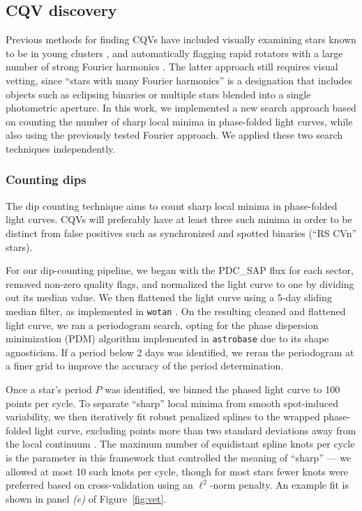 \documentclass[11pt,twocolumn,tighten]{aastex63}
\begin{document}
\subsection{CQV discovery}
\label{subsec:discoverymethods}

Previous methods for finding CQVs have included visually examining
stars known to be in young clusters
\citep{2016AJ....152..114R,2017AJ....153..152S}, and automatically
flagging rapid rotators with a large number of strong Fourier
harmonics \citep{2019ApJ...876..127Z}.  The latter approach still
requires visual vetting, since ``stars with many Fourier harmonics''
is a designation that includes objects such as eclipsing binaries or
multiple stars blended into a single photometric aperture.  In this
work, we implemented a new search approach based on counting the
number of sharp local minima in phase-folded light curves, while also
using the previously tested Fourier approach.  We applied these two
search techniques independently.   


\subsubsection{Counting dips}
\label{subsec:counting}

The dip counting technique aims to count sharp local minima in
phase-folded light curves.  CQVs will preferably have at least three
such minima in order to be distinct from false positives such as
synchronized and spotted binaries (``RS CVn'' stars). 

For our dip-counting pipeline, we began with the PDC\_SAP flux for
each sector, removed non-zero quality flags, and normalized the light
curve to one by dividing out its median value.  We then flattened the
light curve using a 5-day sliding median filter, as implemented in
\texttt{wotan} \citep{2019AJ....158..143H}.  On the resulting cleaned
and flattened light curve, we ran a periodogram search, opting for the
\citet{1978ApJ...224..953S} phase dispersion minimization (PDM)
algorithm implemented in \texttt{astrobase}
\citep{2021zndo...1011188B} due to its shape agnosticism.  If a period
below 2 days was identified, we reran the periodogram at a finer grid
to improve the accuracy of the period determination.

Once a star's period $P$ was identified, we binned the phased light
curve to 100 points per cycle.  To separate ``sharp'' local minima
from smooth spot-induced variability, we then iteratively fit robust
penalized splines to the wrapped phase-folded light curve, excluding
points more than two standard deviations away from the local continuum
\citep{2019AJ....158..143H}.  The maximum number of equidistant spline
knots per cycle is the parameter in this framework that controlled the
meaning of ``sharp'' --- we allowed at most 10 such knots per cycle,
though for most stars fewer knots were preferred based on
cross-validation using an $\ell^2$-norm penalty.  An example fit is
shown in panel {\it (e)} of Figure~\ref{fig:vet}.
\end{document}
